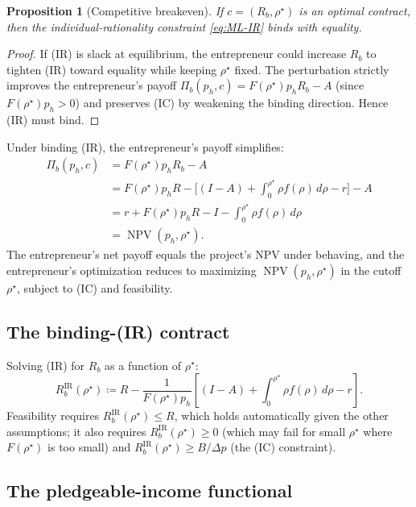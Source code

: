 \documentclass[11pt,a4paper,oneside]{book}
\def\leq{\leqslant}
\def\geq{\geqslant}
\DeclareMathOperator{\NPV}{NPV}
\newcommand{\IR}{\mathrm{IR}}
\theoremstyle{plain}
\newtheorem{proposition}[theorem]{Proposition}
\theoremstyle{definition}
\theoremstyle{remark}
\numberwithin{equation}{chapter}
\begin{document}
\begin{proposition}[Competitive breakeven]\label{prop:ML-breakeven}
If $c = (R_b, \rho^\star)$ is an optimal contract, then the individual-rationality constraint \eqref{eq:ML-IR} binds with equality.
\end{proposition}

\begin{proof}
If (IR) is slack at equilibrium, the entrepreneur could increase $R_b$ to tighten (IR) toward equality while keeping $\rho^\star$ fixed.
The perturbation strictly improves the entrepreneur's payoff $\Pi_b(p_h, c) = F(\rho^\star) p_h R_b - A$ (since $F(\rho^\star) p_h > 0$) and preserves (IC) by weakening the binding direction.
Hence (IR) must bind.
\end{proof}

Under binding (IR), the entrepreneur's payoff simplifies:
\begin{align*}
  \Pi_b(p_h, c) &= F(\rho^\star) p_h R_b - A \\
  &= F(\rho^\star) p_h R - \bigl[ (I - A) + \int_0^{\rho^\star} \rho f(\rho) \, d\rho - r \bigr] - A \\
  &= r + F(\rho^\star) p_h R - I - \int_0^{\rho^\star} \rho f(\rho) \, d\rho \\
  &= \NPV(p_h, \rho^\star).
\end{align*}
The entrepreneur's net payoff equals the project's NPV under behaving, and the entrepreneur's optimization reduces to maximizing $\NPV(p_h, \rho^\star)$ in the cutoff $\rho^\star$, subject to (IC) and feasibility.

\subsection{The binding-(IR) contract}

Solving (IR) for $R_b$ as a function of $\rho^\star$:
\begin{equation}\label{eq:ML-Rb-IR}
  R_b^{\IR}(\rho^\star) \coloneqq R - \frac{1}{F(\rho^\star) p_h} \left[ (I - A) + \int_0^{\rho^\star} \rho f(\rho) \, d\rho - r \right].
\end{equation}
Feasibility requires $R_b^{\IR}(\rho^\star) \leq R$, which holds automatically given the other assumptions; it also requires $R_b^{\IR}(\rho^\star) \geq 0$ (which may fail for small $\rho^\star$ where $F(\rho^\star)$ is too small) and $R_b^{\IR}(\rho^\star) \geq B/\Delta p$ (the (IC) constraint).

\subsection{The pledgeable-income functional}
\end{document}

